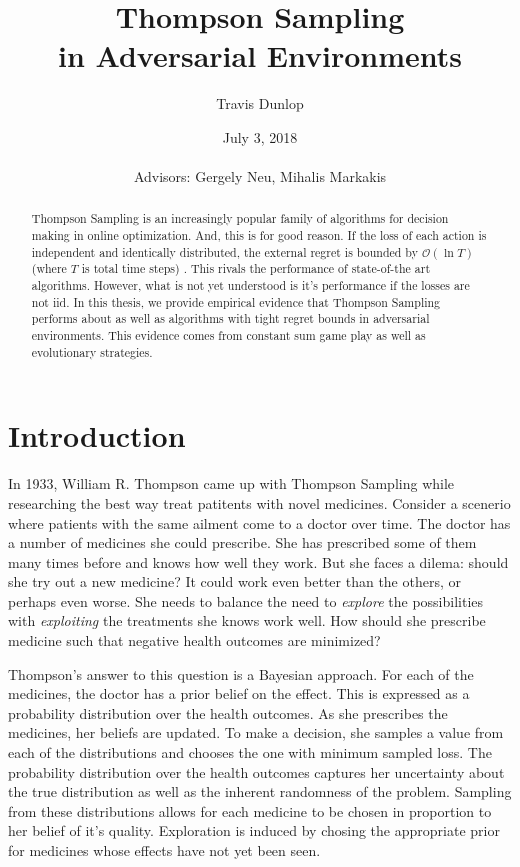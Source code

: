 \documentclass[10pt,a4paper]{article} %
\begin{document}
	\pagestyle{plain}
	\title{\rmfamily\normalfont Thompson Sampling \\in Adversarial Environments}
	\author{Travis Dunlop }
	\date{July 3, 2018\\ $\,$ 
			 \\Advisors: Gergely Neu, Mihalis Markakis} 
	
	\maketitle
	
	\begin{abstract}
		Thompson Sampling is an increasingly popular family of algorithms for decision making in online optimization.  And, this is for good reason.  If the loss of each action is independent and identically distributed, the external regret is bounded by $\mathcal{O}(\ln T)$ (where $T$ is total time steps) \cite{agrawal}. This rivals the performance of state-of-the art algorithms.  However, what is not yet understood is it's performance if the losses are not iid.  In this thesis, we provide empirical evidence that Thompson Sampling performs about as well as algorithms with tight regret bounds in adversarial environments.  This evidence comes from constant sum game play as well as evolutionary strategies.
	\end{abstract}
	
	\section{Introduction}
	
	In 1933, William R. Thompson came up with Thompson Sampling \cite{original_gangster} while researching the best way treat patitents with novel medicines.  Consider a scenerio where patients with the same ailment come to a doctor over time.  The doctor has a number of medicines she could prescribe.  She has prescribed some of them many times before and knows how well they work.  But she faces a dilema: should she try out a new medicine? It could work even better than the others, or perhaps even worse.  She needs to balance the need to \textit{explore} the possibilities with \textit{exploiting} the treatments she knows work well.  How should she prescribe medicine such that negative health outcomes are minimized?
	
	Thompson's answer to this question is a Bayesian approach.  For each of the medicines, the doctor has a prior belief on the effect.  This is expressed as a probability distribution over the health outcomes.  As she prescribes the medicines, her beliefs are updated.  To make a decision, she samples a value from each of the distributions and chooses the one with minimum sampled loss.  The probability distribution over the health outcomes captures her uncertainty about the true distribution as well as the inherent randomness of the problem.  Sampling from these distributions allows for each medicine to be chosen in proportion to her belief of it's quality.  Exploration is induced by chosing the appropriate prior for medicines whose effects have not yet been seen.
	
\end{document}
